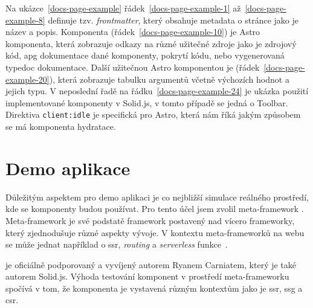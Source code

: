 Na ukázce~\ref{docs-page-example} řádek~\ref{docs-page-example-1} až~\ref{docs-page-example-8} definuje tzv. \textit{frontmatter}, který obsahuje metadata o stránce jako je název a popis.
Komponenta  (řádek~\ref{docs-page-example-10}) je Astro komponenta, která zobrazuje odkazy na různé užitečné zdroje jako je zdrojový kód, \gls{apg} dokumentace dané komponenty, pokrytí kódu, nebo vygenerovaná typedoc dokumentace.
Další užitečnou Astro komponentou je  (řádek~\ref{docs-page-example-20}), která zobrazuje tabulku argumentů včetně výchozích hodnot a jejich typu.
V neposlední řadě na řádku~\ref{docs-page-example-24} je ukázka použití implementované komponenty v Solid.js, v tomto případě se jedná o Toolbar.
Direktiva \texttt{client:idle} je specifická pro Astro, která nám říká jakým způsobem se má komponenta \gls{hydratace}.

\section{Demo aplikace}

Důležitým aspektem pro demo aplikaci je co nejbližší simulace reálného prostředí, kde se komponenty budou používat.
Pro tento účel jsem zvolil meta-framework . Meta-framework je své podstatě framework postavený nad vícero frameworky, který zjednodušuje různé aspekty vývoje.
V kontextu meta-frameworků na webu se může jednat například o \gls{ssr}, \textit{routing} a \textit{serverless} funkce~\cite{prismic-metaframework}.

 je oficiálně podporovaný a vyvíjený autorem Ryanem Carniatem, který je také autorem Solid.js.
Výhoda testování komponent v prostředí meta-frameworku spočívá v tom, že komponenta je vystavená různým kontextům jako je \gls{ssr}, \gls{ssg} a \gls{csr}.
